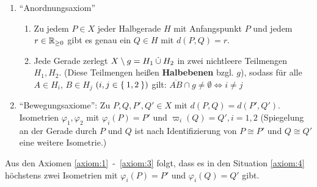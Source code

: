 \begin{definition}
    \begin{enumerate}[label=§\arabic*),ref=§\arabic*,start=3]
        \item \enquote{Anordnungsaxiom}\label{axiom:3}
            \begin{enumerate}[label=(\roman*),ref=§\theenumi{} (\roman*)]
                \item  Zu jedem $P \in X$ jeder Halbgerade $H$ mit \label{axiom:3.1}
                      Anfangspunkt $P$ und jedem $r \in \mathbb{R}_{\geq 0}$
                      gibt es genau ein $Q \in H$ mit $d(P,Q) = r$.
                \item Jede Gerade zerlegt $X \setminus g = H_1 \mathbin{\dot{\cup}} H_2$
                      in zwei nichtleere Teilmengen $H_1, H_2$.
                      (Diese Teilmengen heißen \textbf{Halbebenen} bzgl. $g$),
                      sodass für alle $A \in H_i$, $B \in H_j$
                      $(i,j \in \Set{1,2})$ gilt: $\overline{AB} \cap g \neq \emptyset \Leftrightarrow i \neq j$
            \end{enumerate}
        \item \enquote{Bewegungsaxiome}: Zu $P, Q, P', Q' \in X$\label{axiom:4}
            mit $d(P,Q) = d(P', Q')$. Isometrien $\varphi_1, \varphi_2$
            mit $\varphi_i (P) = P'$ und $\varpi_i(Q) = Q', i=1,2$
            (Spiegelung an der Gerade durch $P$ und $Q$ ist nach 
             Identifizierung von $P \cong P'$ und $Q \cong Q'$ eine
             weitere Isometrie.)
    \end{enumerate}
\end{definition}

\begin{proposition}%
    Aus den Axiomen \ref{axiom:1}~-~\ref{axiom:3} folgt, dass es in 
    den Situation \ref{axiom:4} höchstens zwei Isometrien mit
    $\varphi_i(P) = P'$ und $\varphi_i(Q) = Q'$ gibt.
\end{proposition}

